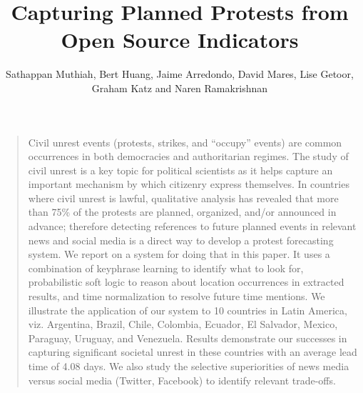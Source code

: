 \documentclass[letterpaper]{article}
\title{Capturing Planned Protests from Open Source Indicators}
\author{Sathappan Muthiah, Bert Huang, Jaime Arredondo, David Mares,
Lise Getoor, Graham Katz and Naren Ramakrishnan}
\begin{document}
\newcommand{\then}{\Rightarrow}
\newcommand{\softor}{\operatornamewithlimits{{\vee}}}
\newcommand{\softand}{\operatornamewithlimits{{\wedge}}}
\newcommand{\softthen}{\operatornamewithlimits{{\then}}}
\newcommand{\softneg}{\operatornamewithlimits{{\neg}}}
\theoremstyle{plain}
\newtheorem{exmp}{Example}
\maketitle
\onecolumn


\begin{quote} %
Civil unrest events (protests, strikes, and ``occupy'' events) are common
occurrences in both democracies and authoritarian regimes. The study of civil
unrest is a key topic for political scientists as it helps capture an important
mechanism by which citizenry express themselves. In countries where civil
unrest is lawful, qualitative analysis has revealed that more than 75\% of the
protests are planned, organized, and/or announced in advance; therefore
detecting references to future planned events in relevant news and social media
is a direct way to develop a protest forecasting system. We report on a system
for doing that in this paper. It uses a combination of keyphrase learning to
identify what to look for, probabilistic soft logic to reason about location
occurrences in extracted results, and time normalization to resolve future time
mentions. We illustrate the application of our system to 10 countries in Latin
America, viz. Argentina, Brazil, Chile, Colombia, Ecuador, El Salvador, Mexico,
Paraguay, Uruguay, and Venezuela. Results demonstrate our successes in
capturing significant societal unrest in these countries with an average lead
time of 4.08 days. We also study the selective superiorities of news media
versus social media (Twitter, Facebook) to identify relevant trade-offs.
\end{quote}
\end{document}

